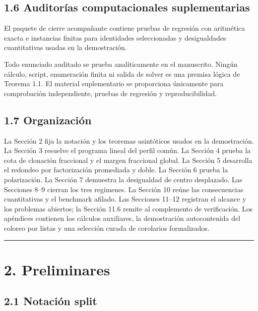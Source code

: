 \documentclass[spanish,11pt,a4paper]{article}
\begin{document}
\subsection{1.6 Auditorías computacionales
suplementarias}\label{auditoruxedas-computacionales-suplementarias}

El paquete de cierre acompañante contiene pruebas de regresión con
aritmética exacta e instancias finitas para identidades seleccionadas y
desigualdades cuantitativas usadas en la demostración.

Todo enunciado auditado se prueba analíticamente en el manuscrito.
Ningún cálculo, script, enumeración finita ni salida de solver es una
premisa lógica de Teorema 1.1. El material suplementario se proporciona
únicamente para comprobación independiente, pruebas de regresión y
reproducibilidad.

\subsection{1.7 Organización}\label{organizaciuxf3n}

La Sección 2 fija la notación y los teoremas asintóticos usados en la
demostración. La Sección 3 resuelve el programa lineal del perfil común.
La Sección 4 prueba la cota de clonación fraccional y el margen
fraccional global. La Sección 5 desarrolla el redondeo por factorización
promediada y doble. La Sección 6 prueba la polarización. La Sección 7
demuestra la desigualdad de centro desplazado. Las Secciones 8--9
cierran los tres regímenes. La Sección 10 reúne las consecuencias
cuantitativas y el benchmark afilado. Las Secciones 11--12 registran el
alcance y los problemas abiertos; la Sección 11.6 remite al complemento
de verificación. Los apéndices contienen los cálculos auxiliares, la
demostración autocontenida del coloreo por listas y una selección curada
de corolarios formalizados.

\begin{center}\rule{0.5\linewidth}{0.5pt}\end{center}

\section{2. Preliminares}\label{preliminares}

\subsection{2.1 Notación split}\label{notaciuxf3n-split}
\end{document}

